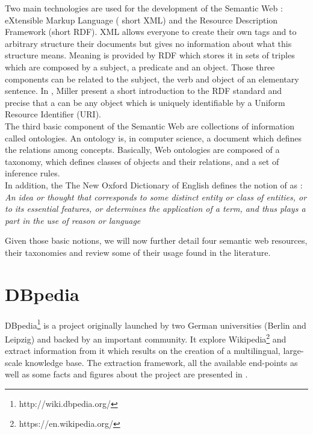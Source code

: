 Two main technologies are used for the development of the Semantic Web : eXtensible Markup Language ( short XML) and the Resource Description Framework (short RDF). XML allows everyone to create their own tags and to arbitrary structure their documents but gives no information about what this structure means. Meaning is provided by RDF which stores it in sets of triples which are composed by a subject, a predicate and an object. Those three components can be related to the subject, the verb and object of an elementary sentence. In \cite{miller1998introduction}, Miller present a short introduction to the RDF standard and precise that a  can be any object which is uniquely identifiable by a Uniform Resource Identifier (URI).\\

The third basic component of the Semantic Web are collections of information called ontologies. An ontology is, in computer science, a document which defines the relations among concepts. Basically, Web ontologies are composed of a taxonomy, which defines classes of objects and their relations, and a set of inference rules.\\

In addition, the The New Oxford Dictionary of English defines the notion of  as : \emph{An idea or thought that corresponds to some distinct entity or class of entities, or to its essential features, or determines the application of a term, and thus plays a part in the use of reason or language}

Given those basic notions, we will now further detail four semantic web resources, their taxonomies and review some of their usage found in the literature.


\section{DBpedia} %
\label{sec:dbpedia}

DBpedia\footnote{http://wiki.dbpedia.org/} is a project originally launched by two German universities (Berlin and Leipzig) and backed by an important community. It explore Wikipedia\footnote{https://en.wikipedia.org/} and extract information from it which results on the creation of a multilingual, large-scale knowledge base. The extraction framework, all the available end-points as well as some facts and figures about the project are presented in \cite{lehmann2014dbpedia}.\\

